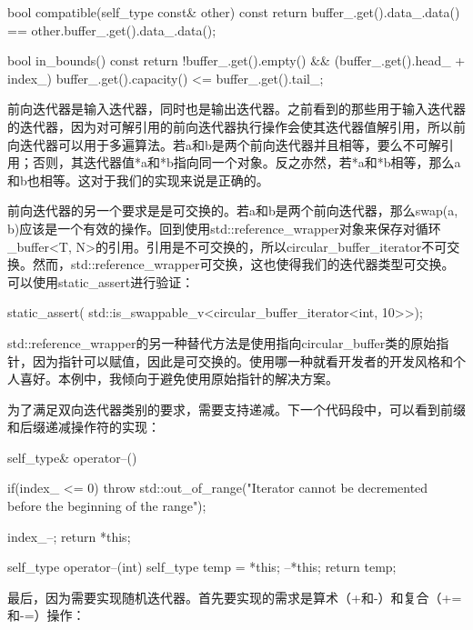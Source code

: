 \begin{cpp}
bool compatible(self_type const& other) const
{
	return buffer_.get().data_.data() ==
		   other.buffer_.get().data_.data();
}

bool in_bounds() const
{
	return
		!buffer_.get().empty() &&
		(buffer_.get().head_ + index_) %
		 buffer_.get().capacity() <= buffer_.get().tail_;
}
\end{cpp}

前向迭代器是输入迭代器，同时也是输出迭代器。之前看到的那些用于输入迭代器的迭代器，因为对可解引用的前向迭代器执行操作会使其迭代器值解引用，所以前向迭代器可以用于多遍算法。若a和b是两个前向迭代器并且相等，要么不可解引用；否则，其迭代器值*a和*b指向同一个对象。反之亦然，若*a和*b相等，那么a和b也相等。这对于我们的实现来说是正确的。

前向迭代器的另一个要求是是可交换的。若a和b是两个前向迭代器，那么swap(a, b)应该是一个有效的操作。回到使用std::reference\_wrapper对象来保存对循环\_buffer<T, N>的引用。引用是不可交换的，所以circular\_buffer\_iterator不可交换。然而，std::reference\_wrapper可交换，这也使得我们的迭代器类型可交换。可以使用static\_assert进行验证：

\begin{cpp}
static_assert(
	std::is_swappable_v<circular_buffer_iterator<int, 10>>);
\end{cpp}

\begin{important}
std::reference\_wrapper的另一种替代方法是使用指向circular\_buffer类的原始指针，因为指针可以赋值，因此是可交换的。使用哪一种就看开发者的开发风格和个人喜好。本例中，我倾向于避免使用原始指针的解决方案。
\end{important}

为了满足双向迭代器类别的要求，需要支持递减。下一个代码段中，可以看到前缀和后缀递减操作符的实现：

\begin{cpp}
self_type& operator--()
{
	if(index_ <= 0)
		throw std::out_of_range("Iterator cannot be
			decremented before the beginning of the range");
			
	index_--;
	return *this;
}

self_type operator--(int)
{
	self_type temp = *this;
	--*this;
	return temp;
}
\end{cpp}

最后，因为需要实现随机迭代器。首先要实现的需求是算术（+和-）和复合（+=和-=）操作：


